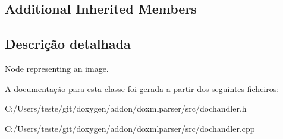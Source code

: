 \subsection*{Additional Inherited Members}


\subsection{Descrição detalhada}
Node representing an image. 



A documentação para esta classe foi gerada a partir dos seguintes ficheiros\-:\begin{DoxyCompactItemize}
\item 
C\-:/\-Users/teste/git/doxygen/addon/doxmlparser/src/dochandler.\-h\item 
C\-:/\-Users/teste/git/doxygen/addon/doxmlparser/src/dochandler.\-cpp\end{DoxyCompactItemize}
